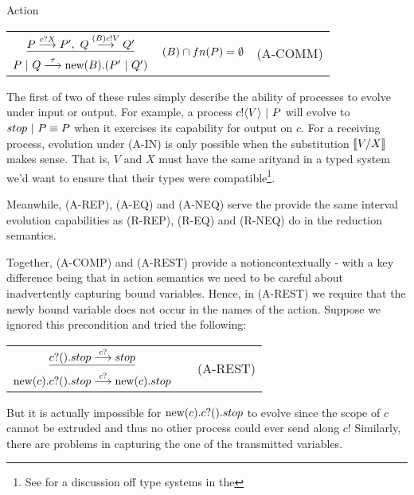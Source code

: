 \begin{definition}{Action}
\begin{center}
\begin{tabular}{rllll}
		\multicolumn{3}{c}{$\underline{P\overset{{{c}?{X}}}{\longrightarrow} P',\ Q \overset{{({B}){c}!{V}}}{\longrightarrow} Q'}$} & \multirow{2}{*}{\footnotesize{$\textstyle ({B})\cap fn(P) = \emptyset$ }} & \multirow{2}{*}{\tiny{(A-COMM)}}\\
		\multicolumn{3}{c}{$P\ |\  Q \overset{{\tau}}{\longrightarrow} \text{new}({B}).(P'\ |\  Q')$}\\[10pt]
	\end{tabular}\end{center}
\end{definition}
 The first of two of these rules simply describe the ability of processes to evolve under input or output.  For example, a process ${c}!\langle{V}\rangle \ |\  P$ will evolve to $stop \ |\  P \equiv P$ when it exercises its capability for output on $c$.  For a receiving process, evolution under (A-IN) is only possible when the substitution $\llbracket{V}/{X}\rrbracket$ makes sense.  That is, $V$ and $X$ must have the same arityand in a typed system we'd want to ensure that their types were compatible\footnote{See \cite{henn07} for a discussion off type systems in the \picalc}.

Meanwhile, (A-REP), (A-EQ) and (A-NEQ) serve the provide the same interval evolution capabilities as (R-REP), (R-EQ) and (R-NEQ) do in the reduction semantics.

Together, (A-COMP) and (A-REST) provide a notioncontextually - with a key difference being that in action semantics we need to be careful about inadvertently capturing bound variables.  Hence, in (A-REST) we require that the newly bound variable does not occur in the names of the action.  Suppose we ignored this precondition and tried the following:
\begin{center}\begin{tabular}{rllll}
	\multicolumn{3}{c}{$\underline{{c}?({}).stop \overset{{{c}?{}}}{\longrightarrow} stop}$} & & \multirow{2}{*}{\tiny{(A-REST)}}\\
	\multicolumn{3}{c}{$\text{new}({c}). {c}?({}).stop \overset{{{c}?{}}}{\longrightarrow} \text{new}({c}). stop$}\\[10pt]
\end{tabular}\end{center}
But it is actually impossible for $\text{new}({c}). {c}?({}).stop$ to evolve since the scope of $c$ cannot be extruded and thus no other process could ever send along $c$!  Similarly, there are problems in capturing the one of the transmitted variables.  

